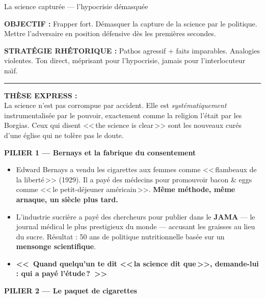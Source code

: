 \documentclass[a4paper,11pt]{article}
\newcommand{\phraseforte}[1]{\textbf{\textcolor{ModeRouge}{<<~#1~>>}}}
\begin{document}

\begin{ficherouge}{La science captur\'{e}e --- l'hypocrisie d\'{e}masqu\'{e}e}

\textbf{OBJECTIF :} Frapper fort. D\'{e}masquer la capture de la science par le politique. Mettre l'adversaire en position d\'{e}fensive d\`{e}s les premi\`{e}res secondes.

\textbf{STRAT\'{E}GIE RH\'{E}TORIQUE :} Pathos agressif + faits imparables. Analogies violentes. Ton direct, m\'{e}prisant pour l'hypocrisie, jamais pour l'interlocuteur na\"{\i}f.

\rule{\textwidth}{0.3pt}

\textbf{\color{ModeRouge}TH\`{E}SE EXPRESS :}\\
La science n'est pas corrompue par accident. Elle est \emph{syst\'{e}matiquement} instrument\-alis\'{e}e par le pouvoir, exactement comme la religion l'\'{e}tait par les Borgias. Ceux qui disent <<\,the science is clear\,>> sont les nouveaux cur\'{e}s d'une \'{e}glise qui ne tol\`{e}re pas le doute.

\vspace{0.3cm}
\textbf{\color{ModeRouge}PILIER 1 --- Bernays et la fabrique du consentement}

\begin{itemize}[nosep, label=\color{ModeRouge}]
  \item Edward Bernays a vendu les cigarettes aux femmes comme <<\,flambeaux de la libert\'{e}\,>> (1929). Il a pay\'{e} des m\'{e}decins pour promouvoir bacon \& eggs comme <<\,le petit-d\'{e}jeuner am\'{e}ricain\,>>. \textbf{M\^{e}me m\'{e}thode, m\^{e}me arnaque, un si\`{e}cle plus tard.}
  \item L'industrie sucri\`{e}re a pay\'{e} des chercheurs pour publier dans le \textbf{JAMA} --- le journal m\'{e}dical le plus prestigieux du monde --- accusant les graisses au lieu du sucre. R\'{e}sultat : 50 ans de politique nutritionnelle bas\'{e}e sur un \textbf{mensonge scientifique}.
  \item \phraseforte{Quand quelqu'un te dit <<\,la science dit que\,>>, demande-lui : qui a pay\'{e} l'\'{e}tude\,?}
\end{itemize}

\vspace{0.3cm}
\textbf{\color{ModeRouge}PILIER 2 --- Le paquet de cigarettes}


\end{ficherouge}
\end{document}
